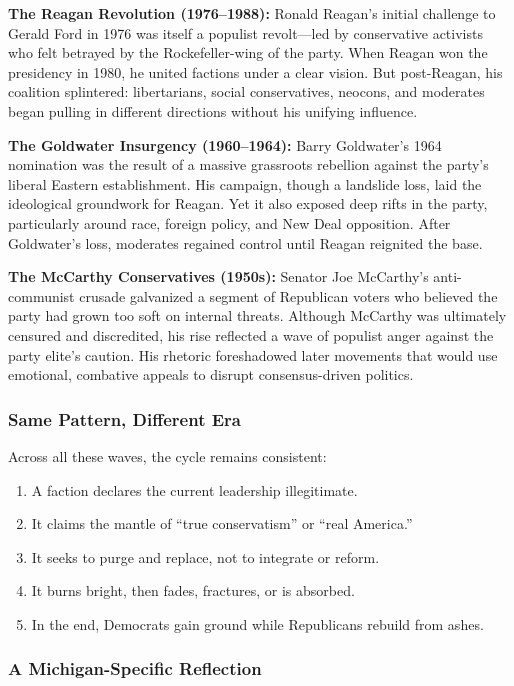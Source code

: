 \textbf{The Reagan Revolution (1976–1988):} Ronald Reagan’s initial challenge to Gerald Ford in 1976 was itself a populist revolt—led by conservative activists who felt betrayed by the Rockefeller-wing of the party. When Reagan won the presidency in 1980, he united factions under a clear vision. But post-Reagan, his coalition splintered: libertarians, social conservatives, neocons, and moderates began pulling in different directions without his unifying influence.

\textbf{The Goldwater Insurgency (1960–1964):} Barry Goldwater’s 1964 nomination was the result of a massive grassroots rebellion against the party’s liberal Eastern establishment. His campaign, though a landslide loss, laid the ideological groundwork for Reagan. Yet it also exposed deep rifts in the party, particularly around race, foreign policy, and New Deal opposition. After Goldwater’s loss, moderates regained control until Reagan reignited the base.

\textbf{The McCarthy Conservatives (1950s):} Senator Joe McCarthy’s anti-communist crusade galvanized a segment of Republican voters who believed the party had grown too soft on internal threats. Although McCarthy was ultimately censured and discredited, his rise reflected a wave of populist anger against the party elite’s caution. His rhetoric foreshadowed later movements that would use emotional, combative appeals to disrupt consensus-driven politics.

\subsubsection{Same Pattern, Different Era}
Across all these waves, the cycle remains consistent:
\begin{enumerate}
\item A faction declares the current leadership illegitimate.
\item It claims the mantle of “true conservatism” or “real America.”
\item It seeks to purge and replace, not to integrate or reform.
\item It burns bright, then fades, fractures, or is absorbed.
\item In the end, Democrats gain ground while Republicans rebuild from ashes.
\end{enumerate}

\subsubsection{A Michigan-Specific Reflection}

